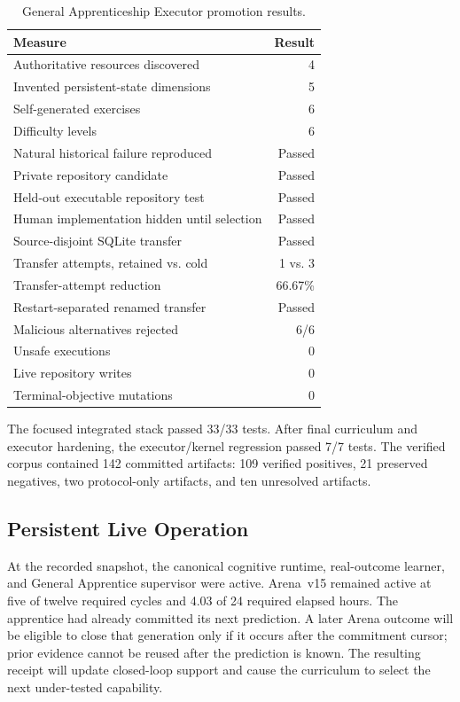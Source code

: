 \begin{table}[htbp]
\centering
\caption{General Apprenticeship Executor promotion results.}
\label{tab:general-apprenticeship-executor-results}
\begin{tabular}{@{}lr@{}}
\toprule
Measure & Result \\
\midrule
Authoritative resources discovered & 4 \\
Invented persistent-state dimensions & 5 \\
Self-generated exercises & 6 \\
Difficulty levels & 6 \\
Natural historical failure reproduced & Passed \\
Private repository candidate & Passed \\
Held-out executable repository test & Passed \\
Human implementation hidden until selection & Passed \\
Source-disjoint SQLite transfer & Passed \\
Transfer attempts, retained vs. cold & 1 vs. 3 \\
Transfer-attempt reduction & 66.67\% \\
Restart-separated renamed transfer & Passed \\
Malicious alternatives rejected & 6/6 \\
Unsafe executions & 0 \\
Live repository writes & 0 \\
Terminal-objective mutations & 0 \\
\bottomrule
\end{tabular}
\end{table}

The focused integrated stack passed 33/33 tests.  After final curriculum and
executor hardening, the executor/kernel regression passed 7/7 tests.  The
verified corpus contained 142 committed artifacts: 109 verified positives, 21
preserved negatives, two protocol-only artifacts, and ten unresolved artifacts.

\subsection{Persistent Live Operation}
\label{subsec:general-apprenticeship-live-operation}

At the recorded snapshot, the canonical cognitive runtime, real-outcome
learner, and General Apprentice supervisor were active.  Arena~v15 remained
active at five of twelve required cycles and 4.03 of 24 required elapsed hours.
The apprentice had already committed its next prediction.  A later Arena
outcome will be eligible to close that generation only if it occurs after the
commitment cursor; prior evidence cannot be reused after the prediction is
known.  The resulting receipt will update closed-loop support and cause the
curriculum to select the next under-tested capability.

